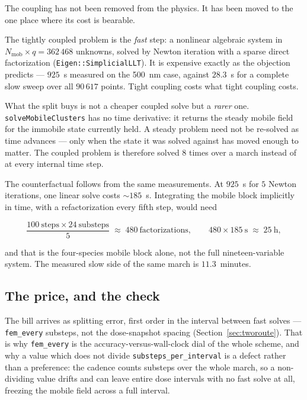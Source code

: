 \documentclass[11pt,a4paper]{article}
\newcommand{\code}[1]{\texttt{\small #1}}
\begin{document}
The coupling has not been removed from the physics. It has been moved to the
one place where its cost is bearable.

The tightly coupled problem is the \emph{fast} step: a nonlinear algebraic
system in $N_{\mathrm{mob}} \times q = 362\,468$ unknowns, solved by Newton
iteration with a sparse direct factorization
(\code{Eigen::SimplicialLLT}). It is expensive exactly as the objection
predicts --- $925$~s measured on the 500~nm case, against $28.3$~s for a
complete slow sweep over all $90\,617$ points. Tight coupling costs what tight
coupling costs.

What the split buys is not a cheaper coupled solve but a \emph{rarer} one.
\code{solveMobileClusters} has no time derivative: it returns the steady mobile
field for the immobile state currently held. A steady problem need not be
re-solved as time advances --- only when the state it was solved against has
moved enough to matter. The coupled problem is therefore solved $8$ times over
a march instead of at every internal time step.

The counterfactual follows from the same measurements. At $925$~s for $5$
Newton iterations, one linear solve costs $\sim\!185$~s. Integrating the mobile
block implicitly in time, with a refactorization every fifth step, would need

\[
  \frac{100 \ \text{steps} \times 24 \ \text{substeps}}{5}
  \;\approx\; 480 \ \text{factorizations},
  \qquad
  480 \times 185\ \mathrm{s} \;\approx\; 25\ \mathrm{h},
\]

and that is the four-species mobile block alone, not the full nineteen-variable
system. The measured slow side of the same march is $11.3$~minutes.

\subsection{The price, and the check}

The bill arrives as splitting error, first order in the interval between fast
solves --- \code{fem\_every} substeps, not the dose-snapshot spacing
(Section~\ref{sec:tworoute}). That is why \code{fem\_every} is the
accuracy-versus-wall-clock dial of the whole scheme, and why a value which does
not divide \code{substeps\_per\_interval} is a defect rather than a preference:
the cadence counts substeps over the whole march, so a non-dividing value drifts
and can leave entire dose intervals with no fast solve at all, freezing the
mobile field across a full interval.
\end{document}
